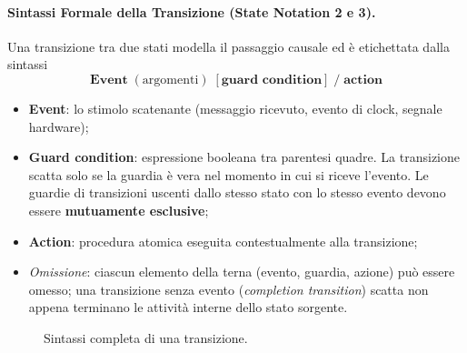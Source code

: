 \documentclass[12pt]{extarticle}
\begin{document}
\paragraph{Sintassi Formale della Transizione (State Notation 2 e 3).}
Una transizione tra due stati modella il passaggio causale ed è etichettata dalla sintassi
$$\textbf{Event}\;(\text{argomenti})\;[\textbf{guard condition}]\;/\;\textbf{action}$$
\begin{itemize}
    \item \textbf{Event}: lo stimolo scatenante (messaggio ricevuto, evento di clock, segnale hardware);
    \item \textbf{Guard condition}: espressione booleana tra parentesi quadre. La transizione scatta solo se la guardia è vera nel momento in cui si riceve l'evento. Le guardie di transizioni uscenti dallo stesso stato con lo stesso evento devono essere \textbf{mutuamente esclusive};
    \item \textbf{Action}: procedura atomica eseguita contestualmente alla transizione;
    \item \textit{Omissione}: ciascun elemento della terna (evento, guardia, azione) può essere omesso; una transizione senza evento (\textit{completion transition}) scatta non appena terminano le attività interne dello stato sorgente.
\end{itemize}

\begin{figure}[htbp]
\centering
{}
\caption{Sintassi completa di una transizione.}
\label{fig:transition_formal_syntax}
\end{figure}
\end{document}
